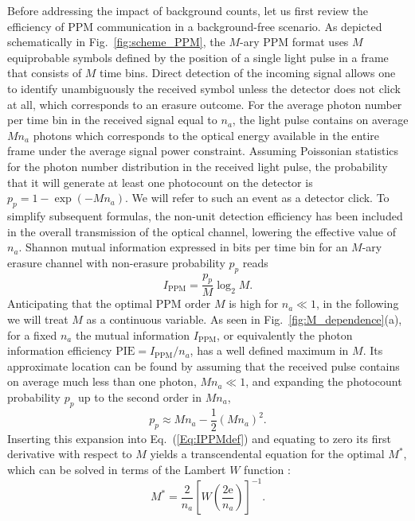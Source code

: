 \documentclass[conference]{IEEEtran}
\newcommand{\optval}[1]{#1^\ast}
\newcommand{\Eul}{\mathrm{e}}
\begin{document}
Before addressing the impact of background counts, let us first review the efficiency of PPM communication in a background-free scenario. As depicted schematically in Fig.~\ref{fig:scheme_PPM}, the $M$-ary PPM format uses $M$ equiprobable symbols defined by the position of a single light pulse in a frame that consists of $M$ time bins. Direct detection of the incoming signal allows one to identify unambiguously the received symbol unless the detector does not click at all, which corresponds to an erasure outcome. For the average photon number per time bin in the received signal equal to $n_a$, the light pulse contains on average $M n_a$ photons which corresponds to the optical energy available in the entire frame under the average signal power constraint. Assuming Poissonian  statistics for the photon number distribution in the received light pulse, the probability that it will generate at least one photocount on the detector is $p_p = 1-\exp(-M n_a)$. We will refer to such an event as a detector click. To simplify subsequent formulas, the non-unit detection efficiency has been included in the overall transmission of the optical channel, lowering the effective value of $n_a$. Shannon mutual information expressed in bits per time bin for an $M$-ary erasure channel with non-erasure probability $p_p$ reads
\begin{equation}
\label{Eq:IPPMdef}
I_{\text{PPM}} = \frac{p_p}{M} \log_2 M.
\end{equation}
Anticipating that the optimal PPM order $M$ is high for $n_a \ll 1$, in the following we will treat $M$ as a continuous variable.
As seen in Fig.~\ref{fig:M_dependence}(a), for a fixed $n_a$ the mutual information $I_{\text{PPM}}$, or equivalently the photon information efficiency $\textrm{PIE}=I_{\text{PPM}}/n_a$, has a well defined maximum in $M$. Its approximate location can be found by assuming that the received pulse contains on average much less than one photon, $M n_a \ll 1$, and expanding the photocount probability $p_p$ up to the second order in $M n_{a}$,
\begin{equation}
\label{eq:p_s_approx}
p_p \approx M n_{a} - \frac{1}{2}  (M n_{a})^2 .
\end{equation}
Inserting this expansion into Eq.~(\ref{Eq:IPPMdef}) and equating to zero its first derivative with respect to $M$ yields a transcendental equation for the optimal $\optval{M}$, which can be solved in terms of the Lambert $W$ function \cite{Jarzyna2015}:
\begin{equation}\label{eq:M_opt_apr}
\optval{M} = \frac{2}{n_{a}} \left[ W \left( \frac{2 \Eul }{n_{a} } \right) \right] ^{-1}.
\end{equation}
\end{document}
